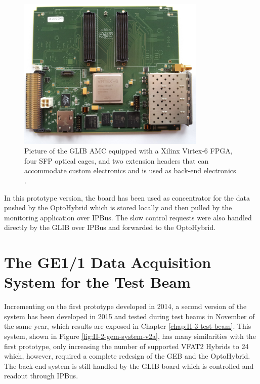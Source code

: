       \begin{figure}[h!]
        \centering
        \includegraphics[width=0.8\textwidth]{img/II-2-daq/glib.jpg}
        \caption{Picture of the GLIB AMC equipped with a Xilinx Virtex-6 FPGA, four SFP optical cages, and two extension headers that can accommodate custom electronics and is used as back-end electronics \cite{Vichoudis:1359270}.}
        \label{fig:II-2-glib}
      \end{figure}

       In this prototype version, the board has been used as concentrator for the data pushed by the OptoHybrid which is stored locally and then pulled by the monitoring application over IPBus. The slow control requests were also handled directly by the GLIB over IPBus and forwarded to the OptoHybrid.

  \section{The GE1/1 Data Acquisition System for the Test Beam}

    Incrementing on the first prototype developed in 2014, a second version of the system has been developed in 2015 and tested during test beams in November of the same year, which results are exposed in Chapter \ref{chap:II-3-test-beam}. This system, shown in Figure \ref{fig:II-2-gem-system-v2a}, has many similarities with the first prototype, only increasing the number of supported VFAT2 Hybrids to 24 which, however, required a complete redesign of the GEB and the OptoHybrid. The back-end system is still handled by the GLIB board which is controlled and readout through IPBus.

